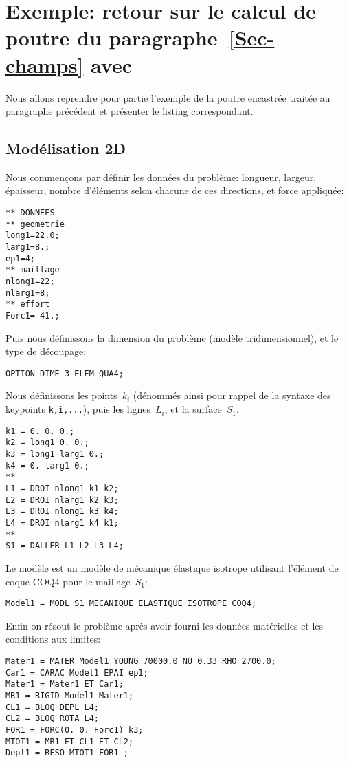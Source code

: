 \section{Exemple: retour sur le calcul de poutre du paragraphe~\ref{Sec-champs} avec \castem}
Nous allons reprendre pour partie l'exemple de la poutre encastrée traitée au paragraphe précédent et présenter le listing \castem correspondant.

\medskip
\subsection{Modélisation 2D}

Nous commençons par définir les données du problème: longueur, largeur, épaisseur, nombre d'éléments selon chacune de ces directions, et force appliquée:
\lstset{language=castem}
\begin{lstlisting}[firstnumber=1]
** DONNEES
** geometrie
long1=22.0;
larg1=8.;
ep1=4;
** maillage
nlong1=22;
nlarg1=8;
** effort
Forc1=-41.;
\end{lstlisting}

Puis nous définissons la dimension du problème (modèle tridimensionnel), et le type de découpage:
\begin{lstlisting}[firstnumber=last]
OPTION DIME 3 ELEM QUA4;
\end{lstlisting}

Nous définissons les points~$k_i$ (dénommés ainsi pour rappel de la syntaxe \ansys des keypoints \verb|k,i,...|), puis les lignes~$L_i$, et la surface~$S_1$.
\begin{lstlisting}[firstnumber=last]
k1 = 0. 0. 0.;
k2 = long1 0. 0.;
k3 = long1 larg1 0.;
k4 = 0. larg1 0.;
**
L1 = DROI nlong1 k1 k2;
L2 = DROI nlarg1 k2 k3;
L3 = DROI nlong1 k3 k4;
L4 = DROI nlarg1 k4 k1;
**
S1 = DALLER L1 L2 L3 L4;
\end{lstlisting}

Le modèle est un modèle de mécanique élastique isotrope utilisant l'élément de coque COQ4 pour le maillage~$S_1$:
\begin{lstlisting}[firstnumber=last]
Model1 = MODL S1 MECANIQUE ELASTIQUE ISOTROPE COQ4;
\end{lstlisting}

Enfin on résout le problème après avoir fourni les données matérielles et les conditions aux limites:
\begin{lstlisting}[firstnumber=last]
Mater1 = MATER Model1 YOUNG 70000.0 NU 0.33 RHO 2700.0;
Car1 = CARAC Model1 EPAI ep1;
Mater1 = Mater1 ET Car1;
MR1 = RIGID Model1 Mater1;
CL1 = BLOQ DEPL L4;
CL2 = BLOQ ROTA L4;
FOR1 = FORC(0. 0. Forc1) k3;
MTOT1 = MR1 ET CL1 ET CL2;
Depl1 = RESO MTOT1 FOR1 ;
\end{lstlisting}

